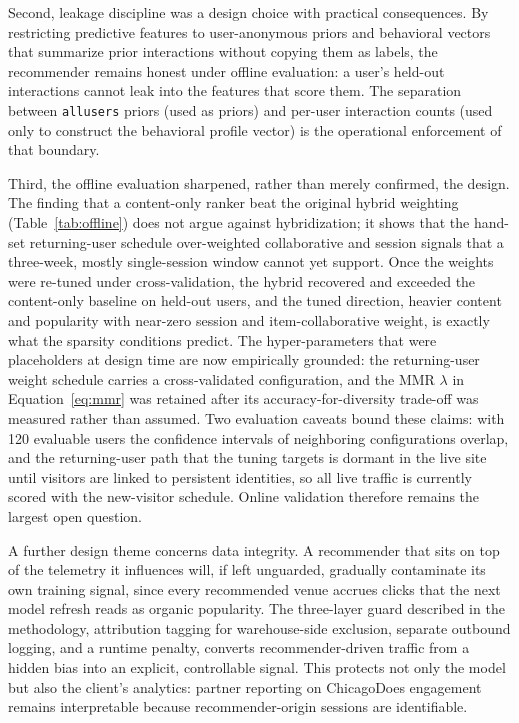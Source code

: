 \documentclass[12pt,letterpaper]{article}
\newcommand{\codeunderscore}{\discretionary{\textunderscore}{}{\textunderscore}}
\newcommand{\code}[1]{\begingroup\let\_\codeunderscore\texttt{\small #1}\endgroup}
\begin{document}
Second, leakage discipline was a design choice with practical
consequences. By restricting predictive features to user-anonymous
priors and behavioral vectors that summarize prior interactions
without copying them as labels, the recommender remains honest under
offline evaluation: a user's held-out interactions cannot leak into
the features that score them. The separation between
\code{*\_all\_users} priors (used as priors) and per-user interaction
counts (used only to construct the behavioral profile vector) is the
operational enforcement of that boundary.

Third, the offline evaluation sharpened, rather than merely
confirmed, the design. The finding that a content-only ranker beat
the original hybrid weighting (Table~\ref{tab:offline}) does not
argue against hybridization; it shows that the hand-set
returning-user schedule over-weighted collaborative and session
signals that a three-week, mostly single-session window cannot yet
support. Once the weights were re-tuned under cross-validation, the
hybrid recovered and exceeded the content-only baseline on held-out
users, and the tuned direction, heavier content and popularity with
near-zero session and item-collaborative weight, is exactly what the
sparsity conditions predict. The hyper-parameters that were
placeholders at design time are now empirically grounded: the
returning-user weight schedule carries a cross-validated
configuration, and the MMR $\lambda$ in Equation~\ref{eq:mmr} was
retained after its accuracy-for-diversity trade-off was measured
rather than assumed. Two evaluation caveats bound these claims: with
120 evaluable users the confidence intervals of neighboring
configurations overlap, and the returning-user path that the tuning
targets is dormant in the live site until visitors are linked to
persistent identities, so all live traffic is currently scored with
the new-visitor schedule. Online validation therefore remains the
largest open question.

A further design theme concerns data integrity. A recommender that
sits on top of the telemetry it influences will, if left unguarded,
gradually contaminate its own training signal, since every
recommended venue accrues clicks that the next model refresh reads
as organic popularity. The three-layer guard described in the methodology,
attribution tagging for warehouse-side exclusion, separate outbound
logging, and a runtime penalty, converts recommender-driven traffic
from a hidden bias into an explicit, controllable signal. This
protects not only the model but also the client's analytics: partner
reporting on ChicagoDoes engagement remains interpretable because
recommender-origin sessions are identifiable.
\end{document}
